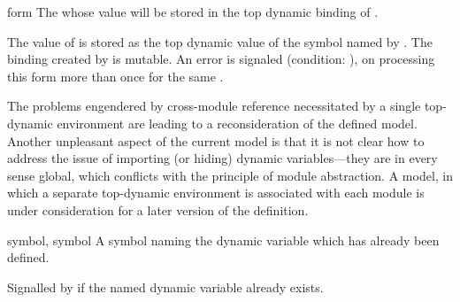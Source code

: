 \begin{optDefinition}
\begin{arguments}
    \item[form] The  whose value will be stored in the top dynamic
    binding of .
\end{arguments}
%
\remarks%
The value of  is stored as the top dynamic value of the symbol named
by  .  The binding created
by  is mutable.  An error is signaled (condition:
), on processing this form more than
once for the same .
%
\begin{note}
    The problems engendered by cross-module reference necessitated by a single
    top-dynamic environment are leading to a reconsideration of the defined
    model.  Another unpleasant aspect of the current model is that it is not
    clear how to address the issue of importing (or hiding) dynamic
    variables---they are in every sense global, which conflicts with the
    principle of module abstraction.  A model, in which a separate top-dynamic
    environment is associated with each module is under consideration for a
    later version of the definition.
\end{note}

%
\begin{initoptions}
    \item[symbol, symbol] A symbol naming the dynamic variable which has already
    been defined.
\end{initoptions}
%
\remarks%
Signalled by  if the named dynamic variable already
exists.
\end{optDefinition}

